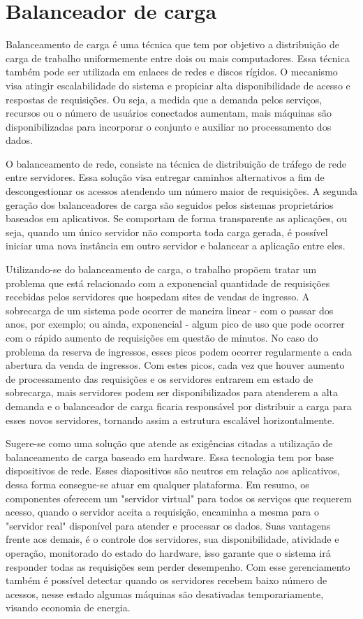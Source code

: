 \chapter{Balanceador de carga}\label{balanceador-de-carga}

Balanceamento de carga é uma técnica que tem por objetivo a distribuição de carga de trabalho uniformemente entre dois ou
mais computadores. Essa técnica também pode ser utilizada em enlaces de redes e discos rígidos. O mecanismo visa atingir
escalabilidade do sistema e propiciar alta disponibilidade de acesso e respostas de requisições. Ou seja, a medida que a
demanda pelos serviços, recursos ou o número de usuários conectados aumentam, mais máquinas são disponibilizadas para incorporar
o conjunto e auxiliar no processamento dos dados.


O balanceamento de rede, consiste na técnica de distribuição de tráfego de rede entre servidores. Essa solução visa entregar
caminhos alternativos a fim de descongestionar os acessos atendendo um número maior de requisições. A segunda geração dos
balanceadores de carga são seguidos pelos sistemas proprietários baseados em aplicativos. Se comportam de forma transparente
as aplicações, ou seja, quando um único servidor não comporta toda carga gerada, é possível iniciar uma nova instância em
outro servidor e balancear a aplicação entre eles.


Utilizando-se do balanceamento de carga, o trabalho propõem tratar um problema que está relacionado com a exponencial
quantidade de requisições recebidas pelos servidores que hospedam sites de vendas de ingresso. A sobrecarga de um
sistema pode ocorrer de maneira linear - com o passar dos anos, por exemplo; ou ainda, exponencial - algum pico de uso
que pode ocorrer com o rápido aumento de requisições em questão de minutos.
No caso do problema da reserva de ingressos, esses picos podem ocorrer regularmente a cada abertura da venda de ingressos.
Com estes picos, cada vez que houver aumento de processamento das requisições e os servidores entrarem em
estado de sobrecarga, mais servidores podem ser disponibilizados para atenderem a alta demanda e o balanceador de carga
ficaria responsável por distribuir a carga para esses novos servidores, tornando assim a estrutura escalável
horizontalmente.

Sugere-se como uma solução que atende as exigências citadas a utilização de balanceamento de carga baseado em hardware.
Essa tecnologia tem por base dispositivos de rede. Esses diapositivos são neutros em relação aos aplicativos, dessa forma
consegue-se atuar em qualquer plataforma. Em resumo, os componentes oferecem um "servidor virtual" para todos os serviços
que requerem acesso, quando o servidor aceita a requisição, encaminha a mesma para o "servidor real" disponível para atender
e processar os dados. Suas vantagens frente aos demais, é o controle dos servidores, sua disponibilidade, atividade e
operação, monitorado do estado do hardware, isso garante que o sistema irá responder todas as requisições sem perder
desempenho. Com esse gerenciamento também é possível detectar quando os servidores recebem baixo número de acessos, nesse
estado algumas máquinas são desativadas temporariamente, visando economia de energia.
